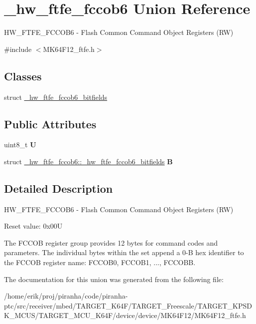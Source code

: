 \hypertarget{union__hw__ftfe__fccob6}{}\section{\+\_\+hw\+\_\+ftfe\+\_\+fccob6 Union Reference}
\label{union__hw__ftfe__fccob6}


H\+W\+\_\+\+F\+T\+F\+E\+\_\+\+F\+C\+C\+O\+B6 -\/ Flash Common Command Object Registers (RW)  




{\ttfamily \#include $<$M\+K64\+F12\+\_\+ftfe.\+h$>$}

\subsection*{Classes}
\begin{DoxyCompactItemize}
\item 
struct \hyperlink{struct__hw__ftfe__fccob6_1_1__hw__ftfe__fccob6__bitfields}{\+\_\+hw\+\_\+ftfe\+\_\+fccob6\+\_\+bitfields}
\end{DoxyCompactItemize}
\subsection*{Public Attributes}
\begin{DoxyCompactItemize}
\item 
uint8\+\_\+t {\bfseries U}\hypertarget{union__hw__ftfe__fccob6_a5d03484223a5c0688bcd505764aea879}{}\label{union__hw__ftfe__fccob6_a5d03484223a5c0688bcd505764aea879}

\item 
struct \hyperlink{struct__hw__ftfe__fccob6_1_1__hw__ftfe__fccob6__bitfields}{\+\_\+hw\+\_\+ftfe\+\_\+fccob6\+::\+\_\+hw\+\_\+ftfe\+\_\+fccob6\+\_\+bitfields} {\bfseries B}\hypertarget{union__hw__ftfe__fccob6_a027583e3c9381632c327aaa7f372022e}{}\label{union__hw__ftfe__fccob6_a027583e3c9381632c327aaa7f372022e}

\end{DoxyCompactItemize}


\subsection{Detailed Description}
H\+W\+\_\+\+F\+T\+F\+E\+\_\+\+F\+C\+C\+O\+B6 -\/ Flash Common Command Object Registers (RW) 

Reset value\+: 0x00U

The F\+C\+C\+OB register group provides 12 bytes for command codes and parameters. The individual bytes within the set append a 0-\/B hex identifier to the F\+C\+C\+OB register name\+: F\+C\+C\+O\+B0, F\+C\+C\+O\+B1, ..., F\+C\+C\+O\+BB. 

The documentation for this union was generated from the following file\+:\begin{DoxyCompactItemize}
\item 
/home/erik/proj/piranha/code/piranha-\/ptc/src/receiver/mbed/\+T\+A\+R\+G\+E\+T\+\_\+\+K64\+F/\+T\+A\+R\+G\+E\+T\+\_\+\+Freescale/\+T\+A\+R\+G\+E\+T\+\_\+\+K\+P\+S\+D\+K\+\_\+\+M\+C\+U\+S/\+T\+A\+R\+G\+E\+T\+\_\+\+M\+C\+U\+\_\+\+K64\+F/device/device/\+M\+K64\+F12/M\+K64\+F12\+\_\+ftfe.\+h\end{DoxyCompactItemize}
